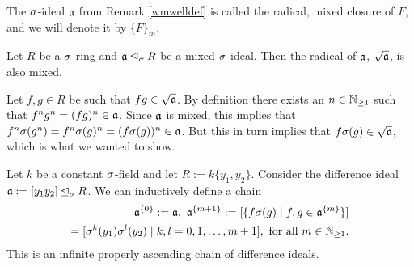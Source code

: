 \begin{defn}
The $\sigma$-ideal $\mathfrak{a}$ from Remark \ref{wmwelldef} is called the radical, mixed closure of $F$, and we will denote it by $\{F\}_{m}$.
\end{defn}


\begin{lem}\label{sqrtmixed}
Let $R$ be a $\sigma$-ring and $\mathfrak{a} \unlhd_{\sigma} R$ be a mixed $\sigma$-ideal. Then the radical of $\mathfrak{a}$, $\sqrt{\mathfrak{a}}$, is also mixed.
\begin{bew}
Let $f,g \in R$ be such that $fg \in \sqrt {\mathfrak{a}}$. By definition there exists an $n \in \mathbb{N}_{\geq1}$ such that $f^n g^n = (fg)^n \in \mathfrak{a}$. Since $\mathfrak{a}$ is mixed, this implies that $f^n \sigma(g^n) = f^n \sigma(g)^n = (f\sigma(g))^n \in \mathfrak{a}$. 
But this in turn implies that $f\sigma(g) \in \sqrt {\mathfrak{a}}$, which is what we wanted to show.
\end{bew}
\end{lem}


\begin{ex}\label{nombasisex}
Let $k$ be a constant $\sigma$-field and let $R:= k\{y_1,y_2\}$. Consider the difference ideal $\mathfrak{a}:= [y_1y_2] \unlhd_{\sigma} R$. We can inductively define a chain \begin{align*}\mathfrak{a}^{\{0\}}:= \mathfrak{a},~ \mathfrak{a}^{\{m+1\}}:= [\{ f \sigma(g) \mid f,g \in \mathfrak{a}^{\{m\}}\}] \\ = [\sigma^k(y_1)\sigma^l(y_2) \mid k,l = 0,1,\ldots,m+1], \text{ for all } m \in \mathbb{N}_{\geq1}.\end{align*}
This is an infinite properly ascending chain of difference ideals. 



\end{ex}


